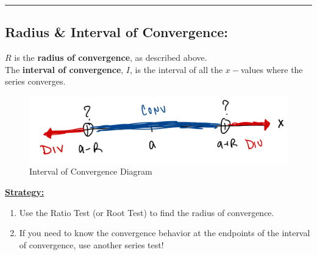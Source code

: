  
 \hrule
 \vspace*{.1in}
 
\subsection*{Radius \& Interval of Convergence:}


 \(R\) is the \textbf{radius of convergence}, as described above.\\
 The \textbf{interval of convergence}, \(I\), is the interval of all the \(x-\)values where the series converges.
\begin{figure}[!h]
\centering
 \includegraphics[width=.75\columnwidth]{Ch6s1-Power-Series-Interval.png}
 \caption{Interval of Convergence Diagram}
\end{figure}
 
 \underline{\textbf{Strategy:}}\\
 \begin{enumerate}
 \item Use the Ratio Test (or Root Test) to find the radius of convergence.
 \item If you need to know the convergence behavior at the endpoints of the interval of convergence, use another series test!
 \end{enumerate}






